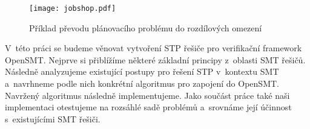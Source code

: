 \begin{figure}[b]
	\centering
	\texttt{[image: jobshop.pdf]}
	\caption{Příklad převodu plánovacího problému do rozdílových omezení} 
	\label{fig:job}
\end{figure}

V~této práci se budeme věnovat vytvoření STP řešiče pro verifikační framework OpenSMT. Nejprve si přiblížíme některé základní principy z~oblasti SMT řešičů. Následně analyzujeme existující postupy pro řešení STP v~kontextu SMT a~navrhneme podle nich konkrétní algoritmus pro zapojení do OpenSMT. Navržený algoritmus následně implementujeme. Jako součást práce také naši implementaci otestujeme na rozsáhlé sadě problémů a~srovnáme její účinnost s~existujícími SMT řešiči.
